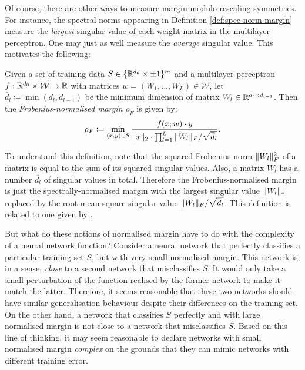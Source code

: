 \begin{refsection}
Of course, there are other ways to measure margin modulo rescaling symmetries. For instance, the spectral norms appearing in Definition \ref{def:spec-norm-margin} measure the \textit{largest} singular value of each weight matrix in the multilayer perceptron. One may just as well measure the \textit{average} singular value. This motivates the following:

\begin{definition}\label{def:frob-norm-margin} Given a set of training data $S \in \{\mathbb{R}^{d_0}\times\pm 1\}^m$ and a multilayer perceptron $f:\mathbb{R}^{d_0}\times \mathcal{W}\to\mathbb{R}$ with matrices $w=(W_1,...,W_L)\in\mathcal{W}$, let $\overline{d}_l\coloneqq \min(d_l,d_{l-1})$ be the minimum dimension of matrix $W_l\in\mathbb{R}^{d_l \times d_{l-1}}$. Then the \textit{Frobenius-normalised margin} $\rho_F$ is given by:
\begin{equation}
    \rho_F \coloneqq \min_{(x,y)\in S} \frac{f(x;w)\cdot y}{\Vert {x} \Vert_2\cdot\prod_{l=1}^L \Vert {W_l} \Vert_F/\sqrt{\overline{d}_l}}.
\end{equation}
\end{definition}
To understand this definition, note that the squared Frobenius norm $\Vert {W_l} \Vert_F^2$ of a matrix is equal to the sum of its squared singular values. Also, a matrix $W_l$ has a number $\overline{d_l}$ of singular values in total. Therefore the Frobenius-normalised margin is just the spectrally-normalised margin with the largest singular value $\Vert {W_l} \Vert_*$ replaced by the root-mean-square singular value $\Vert {W_l} \Vert_F/\sqrt{\overline{d}_l}$. This definition is related to one given by \citet{my-margin}.

But what do these notions of normalised margin have to do with the complexity of a neural network function? Consider a neural network that perfectly classifies a particular training set $S$, but with very small normalised margin. This network is, in a sense, \textit{close} to a second network that misclassifies $S$. It would only take a small perturbation of the function realised by the former network to make it match the latter. Therefore, it seems reasonable that these two networks should have similar generalisation behaviour despite their differences on the training set. On the other hand, a network that classifies $S$ perfectly and with large normalised margin is not close to a network that misclassifies $S$. Based on this line of thinking, it may seem reasonable to declare networks with small normalised margin \textit{complex} on the grounds that they can mimic networks with different training error.


\end{refsection}
